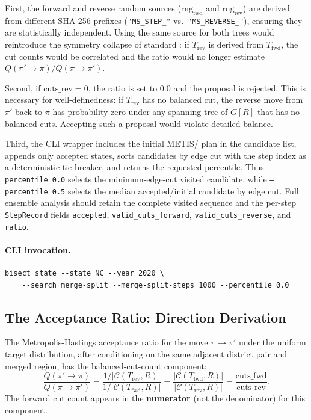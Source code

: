First, the forward and reverse random sources ($\mathrm{rng}_{\mathrm{fwd}}$
and $\mathrm{rng}_{\mathrm{rev}}$) are derived from different SHA-256 prefixes
(\texttt{"MS\_STEP\_"} vs.\ \texttt{"MS\_REVERSE\_"}), ensuring they are
statistically independent.
Using the same source for both trees would reintroduce the symmetry collapse
of standard \recom{}: if $T_{\mathrm{rev}}$ is derived from $T_{\mathrm{fwd}}$,
the cut counts would be correlated and the ratio would no longer estimate
$Q(\pi' \!\to\! \pi) / Q(\pi \!\to\! \pi')$.

Second, if $\mathrm{cuts\_rev} = 0$, the ratio is set to $0.0$ and the
proposal is rejected.
This is necessary for well-definedness: if $T_{\mathrm{rev}}$ has no balanced
cut, the reverse move from $\pi'$ back to $\pi$ has probability zero under
any spanning tree of $G[R]$ that has no balanced cuts.
Accepting such a proposal would violate detailed balance.

Third, the CLI wrapper includes the initial METIS/\cs{} plan in the candidate
list, appends only accepted states, sorts candidates by edge cut with the step
index as a deterministic tie-breaker, and returns the requested percentile.
Thus \texttt{--percentile 0.0} selects the minimum-edge-cut visited candidate,
while \texttt{--percentile 0.5} selects the median accepted/initial candidate by
edge cut.  Full ensemble analysis should retain the complete visited sequence
and the per-step \texttt{StepRecord} fields
\texttt{accepted}, \texttt{valid\_cuts\_forward},
\texttt{valid\_cuts\_reverse}, and \texttt{ratio}.

\paragraph{CLI invocation.}
\begin{verbatim}
bisect state --state NC --year 2020 \
    --search merge-split --merge-split-steps 1000 --percentile 0.0
\end{verbatim}

\subsection{The Acceptance Ratio: Direction Derivation}

\begin{proposition}
\label{prop:ratio-direction}
The Metropolis-Hastings acceptance ratio for the move $\pi \to \pi'$
under the uniform target distribution, after conditioning on the same adjacent
district pair and merged region, has the balanced-cut-count component:
\[
  \frac{Q(\pi' \to \pi)}{Q(\pi \to \pi')}
  = \frac{1 / |\mathcal{C}(T_{\mathrm{rev}}, R)|}
         {1 / |\mathcal{C}(T_{\mathrm{fwd}}, R)|}
  = \frac{|\mathcal{C}(T_{\mathrm{fwd}}, R)|}{|\mathcal{C}(T_{\mathrm{rev}}, R)|}
  = \frac{\mathrm{cuts\_fwd}}{\mathrm{cuts\_rev}}.
\]
The forward cut count appears in the \textbf{numerator} (not the denominator)
for this component.
\end{proposition}

